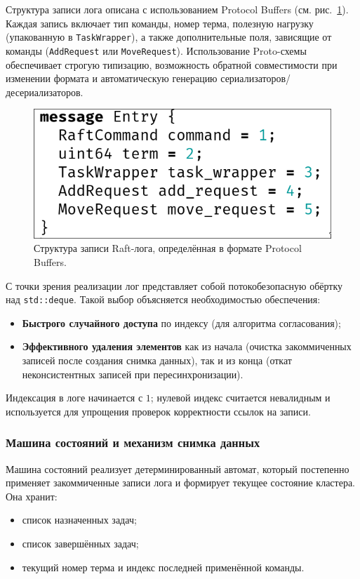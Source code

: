Структура записи лога описана с использованием Protocol Buffers
(см. рис.~\ref{fig:raftlog}). Каждая запись включает тип команды,
номер терма, полезную нагрузку (упакованную в \texttt{TaskWrapper}),
а также дополнительные поля, зависящие от команды
(\texttt{AddRequest} или \texttt{MoveRequest}).
Использование Proto-схемы обеспечивает строгую типизацию,
возможность обратной совместимости при изменении формата и
автоматическую генерацию сериализаторов/десериализаторов.

\begin{figure}[h!]
    \centering
    \includegraphics[width=0.6\linewidth]{inc/raft_log_entry.png}
    \caption{Структура записи Raft-лога, определённая в формате Protocol Buffers.}
    \label{fig:raftlog}
\end{figure}

С точки зрения реализации лог представляет собой потокобезопасную обёртку над
\texttt{std::deque}. Такой выбор объясняется необходимостью обеспечения:

\begin{itemize}
    \item \textbf{Быстрого случайного доступа} по индексу (для алгоритма согласования);
    \item \textbf{Эффективного удаления элементов} как из начала
    (очистка закоммиченных записей после создания снимка данных),
    так и из конца (откат неконсистентных записей при пересинхронизации).
\end{itemize}

Индексация в логе начинается с $1$; нулевой индекс считается невалидным и
используется для упрощения проверок корректности ссылок на записи.

\subsubsection{Машина состояний и механизм снимка данных}

Машина состояний реализует детерминированный автомат, который постепенно
применяет закоммиченные записи лога и формирует текущее состояние кластера. Она
хранит:

\begin{itemize}
    \item список назначенных задач;
    \item список завершённых задач;
    \item текущий номер терма и индекс последней применённой команды.
\end{itemize}

